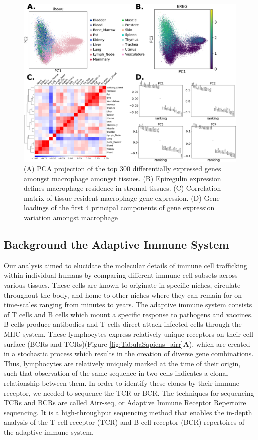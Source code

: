 \begin{figure}[hbt!]
\centering
\includegraphics[width=14cm, keepaspectratio]{figs/TabulaSapiens/fig1_gex_analysis.png}
\caption[Gene Expression Analysis of Tissue Resident Macrophage]{(A) PCA projection of the top 300 differentially expressed genes amongst macrophage amongst tissues. (B) Epiregulin expression defines macrophage residence in stromal tissues. (C) Correlation matrix of tissue resident macrophage gene expression. (D) Gene loadings of the first 4 principal components of gene expression variation amongst macrophage}
\label{fig:TabulaSapiens_gex}
\end{figure}

\subsection{Background the Adaptive Immune System}
Our analysis aimed to elucidate the molecular details of immune cell trafficking within individual humans by comparing different immune cell subsets across various tissues. These cells are known to originate in specific niches, circulate throughout the body, and home to other niches where they can remain for on time-scales ranging from minutes\cite{jerison_heterogeneous_2020} to years\cite{hammarlund_plasma_2017}. The adaptive immune system consists of T cells and B cells which mount a specific response to pathogens and vaccines. B cells produce antibodies and T cells direct attack infected cells through the MHC system. These lymphocytes express relatively unique receptors on their cell surface (BCRs and TCRs)(Figure \ref{fig:TabulaSapiens_airr}\textbf{A}), which are created in a stochastic process which results in the creation of diverse gene combinations\cite{alberts2017molecular}. Thus, lymphocytes are relatively uniquely marked at the time of their origin, such that observation of the same sequence in two cells indicates a clonal relationship between them. In order to identify these clones by their immune receptor, we needed to sequence the TCR or BCR. The techniques for sequencing TCRs and BCRs are called Airr-seq, or Adaptive Immune Receptor Repertoire sequencing. It is a high-throughput sequencing method that enables the in-depth analysis of the T cell receptor (TCR) and B cell receptor (BCR) repertoires of the adaptive immune system. 

